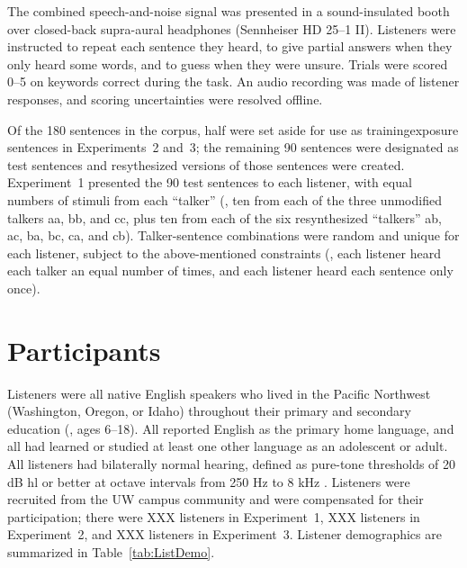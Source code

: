 The combined speech-and-noise signal was presented in a sound-insulated booth over closed-back supra-aural headphones (Sennheiser HD 25–1 II).  Listeners were instructed to repeat each sentence they heard, to give partial answers when they only heard some words, and to guess when they were unsure.  Trials were scored 0–5 on keywords correct during the task.  An audio recording was made of listener responses, and scoring uncertainties were resolved offline.  

Of the 180 sentences in the corpus, half were set aside for use as training\slsh{}exposure sentences in Experiments~2 and~3; the remaining 90 sentences were designated as test sentences and resythesized versions of those sentences were created.  Experiment~1 presented the 90 test sentences to each listener, with equal numbers of stimuli from each “talker” (\ie, ten from each of the three unmodified talkers \ac{aa}, \ac{bb}, and \ac{cc}, plus ten from each of the six resynthesized “talkers” \ac{ab}, \ac{ac}, \ac{ba}, \ac{bc}, \ac{ca}, and \ac{cb}).  Talker-sentence combinations were random and unique for each listener, subject to the above-mentioned constraints (\ie, each listener heard each talker an equal number of times, and each listener heard each sentence only once).

\section{Participants}
Listeners were all native English speakers who lived in the Pacific Northwest (Washington, Oregon, or Idaho) throughout their primary and secondary education (\ie, ages 6–18).  All reported English as the primary home language, and all had learned or studied at least one other language as an adolescent or adult.  All listeners had bilaterally normal hearing, defined as pure-tone thresholds of 20 dB \ac{hl} or better at octave intervals from 250 Hz to 8 kHz .  Listeners were recruited from the UW campus community and were compensated for their participation; there were XXX listeners in Experiment~1, XXX listeners in Experiment~2, and XXX listeners in Experiment~3.  Listener demographics are summarized in Table~\ref{tab:ListDemo}.

